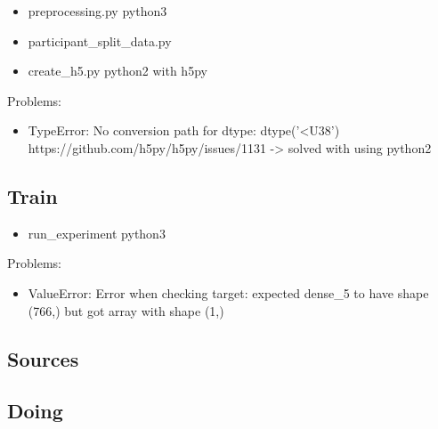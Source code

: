 \documentclass[sigconf,nonacm]{acmart}
\begin{document}
  \begin{itemize}
    \item preprocessing.py python3
    \item participant\_split\_data.py
    \item create\_h5.py python2 with h5py
  \end{itemize}

  Problems:
  \begin{itemize}
    \item TypeError: No conversion path for dtype: dtype('<U38') https://github.com/h5py/h5py/issues/1131 -> solved with using python2
  \end{itemize}

\subsection{Train}

\begin{itemize}
  \item run\_experiment python3
\end{itemize}

Problems:
\begin{itemize}
  \item ValueError: Error when checking target: expected dense\_5 to have shape (766,) but got array with shape (1,)
\end{itemize}

\subsection{Sources}

\subsection{Doing}






\end{document}

